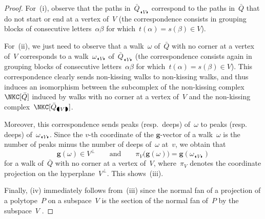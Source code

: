 \documentclass{memo-l}
\theoremstyle{definition}
\renewcommand{\b}[1]{\mathbf{#1}} %
\newcommand{\blinkers}[1]{_{\LEFTCIRCLE \!\! #1 \!\! \RIGHTCIRCLE}} %
\newcommand{\gvector}[1]{\mathbf{g}(#1)} %
\begin{document}
\begin{proof}%
For~(i), observe that the paths in~$\bar Q\blinkers{V}$ correspond to the paths in~$\bar Q$ that do not start or end at a vertex of~$V$ (the correspondence consists in grouping blocks of consecutive letters~$\alpha\beta$ for which~$t(\alpha) = s(\beta) \in V$).

For~(ii), we just need to observe that a walk~$\omega$ of~$\bar Q$ with no corner at a vertex of~$V$ corresponds to a walk~$\omega\blinkers{V}$ of~$\bar Q\blinkers{V}$ (the correspondence consists again in grouping blocks of consecutive letters~$\alpha\beta$ for which~$t(\alpha) = s(\beta) \in V$).
This correspondence clearly sends non-kissing walks to non-kissing walks, and thus induces an isomorphism between the subcomplex of the non-kissing complex~$\NKC[\bar Q]$ induced by walks with no corner at a vertex of~$V$ and the non-kissing complex~$\NKC[\bar Q\blinkers{V}]$.

Moreover, this correspondence sends peaks (resp.~deeps) of~$\omega$ to peaks (resp. deeps) of~$\omega\blinkers{V}$.
Since the $v$-th coordinate of the $\b{g}$-vector of a walk~$\omega$ is the number of peaks minus the number of deeps of~$\omega$ at~$v$, we obtain that
\[
\gvector{\omega} \in V^\perp
\qquad\text{and}\qquad
\pi_V \big( \gvector{\omega} \big) = \gvector{\omega\blinkers{V}}
\]
for a walk of~$\bar Q$ with no corner at a vertex of~$V$, where~$\pi_V$ denotes the coordinate projection on the hyperplane~$V^\perp$.
This shows~(iii).

Finally, (iv) immediately follows from~(iii) since the normal fan of a projection of a polytope~$P$ on a subspace~$V$ is the section of the normal fan of~$P$ by the subspace~$V$ \cite[Lemma~7.11]{Ziegler-polytopes}.
\end{proof}
\end{document}
